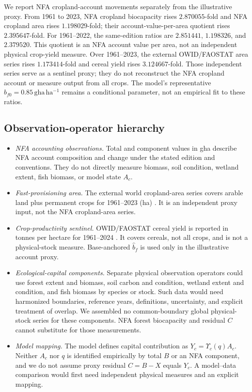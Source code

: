 \documentclass[11pt,a4paper]{article}
\newcommand{\Ups}{\Upsilon_c}
\begin{document}
We report NFA cropland-account movements separately from the illustrative proxy. From 1961 to 2023, NFA cropland biocapacity rises $2.870055$-fold and NFA cropland area rises $1.198029$-fold; their account-value-per-area quotient rises $2.395647$-fold. For 1961--2022, the same-edition ratios are $2.851441$, $1.198326$, and $2.379520$. This quotient is an NFA account value per area, not an independent physical crop-yield measure. Over 1961--2023, the external OWID/FAOSTAT area series rises $1.173414$-fold and cereal yield rises $3.124667$-fold. Those independent series serve as a sentinel proxy; they do not reconstruct the NFA cropland account or measure output from all crops. The model's representative $b_{f0}=0.85\,\mathrm{gha\,ha^{-1}}$ remains a conditional parameter, not an empirical fit to these ratios.

\subsection{Observation-operator hierarchy}\label{si:operator}

\begin{itemize}[leftmargin=1.5em]
\item \emph{NFA accounting observations.} Total and component values in gha describe NFA account composition and change under the stated edition and conventions. They do not directly measure biomass, soil condition, wetland extent, fish biomass, or model state $A_c$.
\item \emph{Fast-provisioning area.} The external world cropland-area series covers arable land plus permanent crops for 1961--2023 (ha) \citep{OWIDCropland2026}. It is an independent proxy input, not the NFA cropland-area series.
\item \emph{Crop-productivity sentinel.} OWID/FAOSTAT cereal yield is reported in tonnes per hectare for 1961--2024 \citep{OWIDCereal2026}. It covers cereals, not all crops, and is not a physical-stock measure. Base-anchored $\hat b_f$ is used only in the illustrative account proxy.
\item \emph{Ecological-capital components.} Separate physical observation operators could use forest extent and biomass, soil carbon and condition, wetland extent and condition, and fish biomass by species or stock. Such data would need harmonized boundaries, reference years, definitions, uncertainty, and explicit treatment of overlap. We assembled no common-boundary global physical-stock series for these components. NFA forest biocapacity and residual $C$ cannot substitute for those measurements.
\item \emph{Model mapping.} The model defines capital contribution as $Y_c=\Ups(q)A_c$. Neither $A_c$ nor $q$ is identified empirically by total $B$ or an NFA component, and we do not assume proxy residual $C=B-X$ equals $Y_c$. A model--data comparison would first need independent physical measures and an explicit mapping.
\end{itemize}
\end{document}

